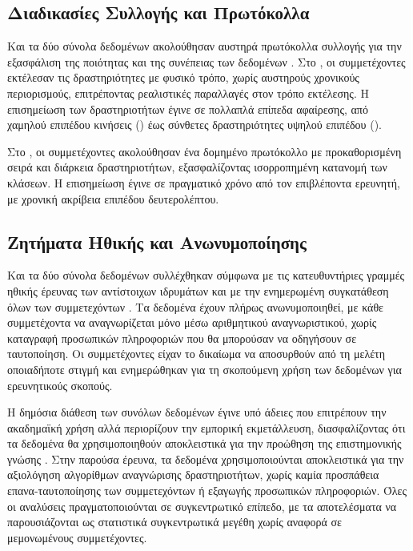 \subsection{Διαδικασίες Συλλογής και Πρωτόκολλα}

Και τα δύο σύνολα δεδομένων ακολούθησαν αυστηρά πρωτόκολλα συλλογής για την εξασφάλιση της ποιότητας και της συνέπειας των δεδομένων \cite{Chen2012sensor}.
Στο , οι συμμετέχοντες εκτέλεσαν τις δραστηριότητες με φυσικό τρόπο, χωρίς αυστηρούς χρονικούς περιορισμούς, επιτρέποντας ρεαλιστικές παραλλαγές στον τρόπο εκτέλεσης.
Η επισημείωση των δραστηριοτήτων έγινε σε πολλαπλά επίπεδα αφαίρεσης, από χαμηλού επιπέδου κινήσεις () έως σύνθετες δραστηριότητες υψηλού επιπέδου ().

Στο , οι συμμετέχοντες ακολούθησαν ένα δομημένο πρωτόκολλο με προκαθορισμένη σειρά και διάρκεια δραστηριοτήτων, εξασφαλίζοντας ισορροπημένη κατανομή των κλάσεων.
Η επισημείωση έγινε σε πραγματικό χρόνο από τον επιβλέποντα ερευνητή, με χρονική ακρίβεια επιπέδου δευτερολέπτου.

\subsection{Ζητήματα Ηθικής και Ανωνυμοποίησης}

Και τα δύο σύνολα δεδομένων συλλέχθηκαν σύμφωνα με τις κατευθυντήριες γραμμές ηθικής έρευνας των αντίστοιχων ιδρυμάτων και με την ενημερωμένη συγκατάθεση όλων των συμμετεχόντων \cite{Kaye2015}.
Τα δεδομένα έχουν πλήρως ανωνυμοποιηθεί, με κάθε συμμετέχοντα να αναγνωρίζεται μόνο μέσω αριθμητικού αναγνωριστικού, χωρίς καταγραφή προσωπικών πληροφοριών που θα μπορούσαν να οδηγήσουν σε
ταυτοποίηση.
Οι συμμετέχοντες είχαν το δικαίωμα να αποσυρθούν από τη μελέτη οποιαδήποτε στιγμή και ενημερώθηκαν για τη σκοπούμενη χρήση των δεδομένων για ερευνητικούς σκοπούς.

Η δημόσια διάθεση των συνόλων δεδομένων έγινε υπό άδειες που επιτρέπουν την ακαδημαϊκή χρήση αλλά περιορίζουν την εμπορική εκμετάλλευση, διασφαλίζοντας ότι τα δεδομένα θα χρησιμοποιηθούν
αποκλειστικά για την προώθηση της επιστημονικής γνώσης \cite{Kaye2015}.
Στην παρούσα έρευνα, τα δεδομένα χρησιμοποιούνται αποκλειστικά για την αξιολόγηση αλγορίθμων αναγνώρισης δραστηριοτήτων, χωρίς καμία προσπάθεια επανα-ταυτοποίησης των συμμετεχόντων ή εξαγωγής
προσωπικών πληροφοριών.
Όλες οι αναλύσεις πραγματοποιούνται σε συγκεντρωτικό επίπεδο, με τα αποτελέσματα να παρουσιάζονται ως στατιστικά συγκεντρωτικά μεγέθη χωρίς αναφορά σε μεμονωμένους συμμετέχοντες.

